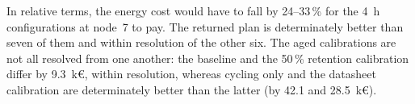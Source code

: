 
    In relative terms, the energy cost would have to fall by 24--33\,\% for the 4~h configurations at node~7 to pay.
    The returned plan is determinately better than seven of them and within resolution of the other six.
    The aged calibrations are not all resolved from one another: the baseline and the 50\,\% retention calibration differ by 9.3~k\euro{}, within resolution, whereas cycling only and the datasheet calibration are determinately better than the latter (by 42.1 and 28.5~k\euro{}).
